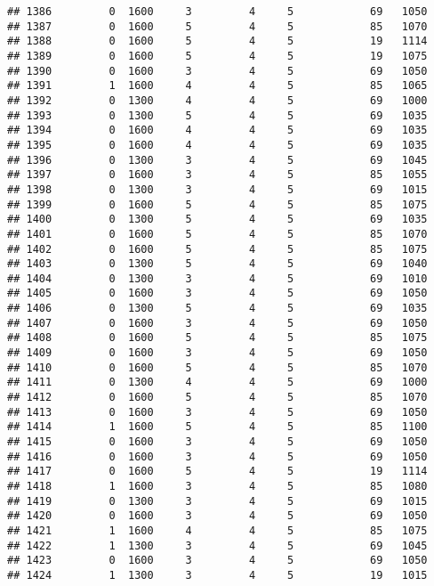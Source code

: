 \documentclass[]{article}
\begin{document}
\begin{verbatim}
## 1386         0  1600     3         4     5            69   1050
## 1387         0  1600     5         4     5            85   1070
## 1388         0  1600     5         4     5            19   1114
## 1389         0  1600     5         4     5            19   1075
## 1390         0  1600     3         4     5            69   1050
## 1391         1  1600     4         4     5            85   1065
## 1392         0  1300     4         4     5            69   1000
## 1393         0  1300     5         4     5            69   1035
## 1394         0  1600     4         4     5            69   1035
## 1395         0  1600     4         4     5            69   1035
## 1396         0  1300     3         4     5            69   1045
## 1397         0  1600     3         4     5            85   1055
## 1398         0  1300     3         4     5            69   1015
## 1399         0  1600     5         4     5            85   1075
## 1400         0  1300     5         4     5            69   1035
## 1401         0  1600     5         4     5            85   1070
## 1402         0  1600     5         4     5            85   1075
## 1403         0  1300     5         4     5            69   1040
## 1404         0  1300     3         4     5            69   1010
## 1405         0  1600     3         4     5            69   1050
## 1406         0  1300     5         4     5            69   1035
## 1407         0  1600     3         4     5            69   1050
## 1408         0  1600     5         4     5            85   1075
## 1409         0  1600     3         4     5            69   1050
## 1410         0  1600     5         4     5            85   1070
## 1411         0  1300     4         4     5            69   1000
## 1412         0  1600     5         4     5            85   1070
## 1413         0  1600     3         4     5            69   1050
## 1414         1  1600     5         4     5            85   1100
## 1415         0  1600     3         4     5            69   1050
## 1416         0  1600     3         4     5            69   1050
## 1417         0  1600     5         4     5            19   1114
## 1418         1  1600     3         4     5            85   1080
## 1419         0  1300     3         4     5            69   1015
## 1420         0  1600     3         4     5            69   1050
## 1421         1  1600     4         4     5            85   1075
## 1422         1  1300     3         4     5            69   1045
## 1423         0  1600     3         4     5            69   1050
## 1424         1  1300     3         4     5            19   1015

\end{verbatim}
\end{document}
